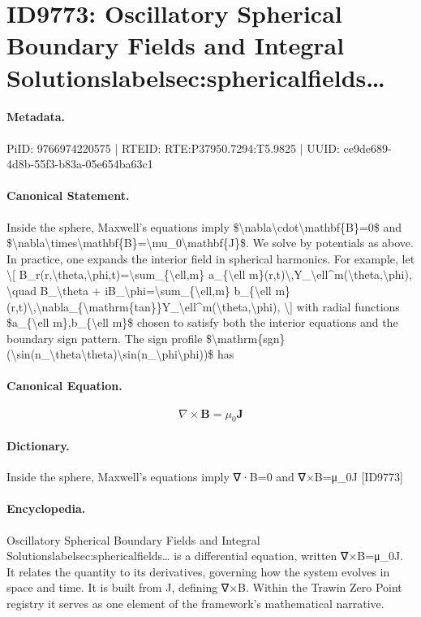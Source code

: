 \section*{ID9773: Oscillatory Spherical Boundary Fields and Integral Solutionslabelsec:sphericalfields…}
\paragraph{Metadata.}
PiID: 9766974220575 | RTEID: RTE:P37950.7294:T5.9825 | UUID: ce9de689-4d8b-55f3-b83a-05e654ba63c1

\paragraph{Canonical Statement.}
Inside the sphere, Maxwell's equations imply \$\textbackslash{}nabla\textbackslash{}cdot\textbackslash{}mathbf\{B\}=0\$ and \$\textbackslash{}nabla\textbackslash{}times\textbackslash{}mathbf\{B\}=\textbackslash{}mu\_0\textbackslash{}mathbf\{J\}\$. We solve by potentials as above. In practice, one expands the interior field in spherical harmonics. For example, let \textbackslash{}[ B\_r(r,\textbackslash{}theta,\textbackslash{}phi,t)=\textbackslash{}sum\_\{\textbackslash{}ell,m\} a\_\{\textbackslash{}ell m\}(r,t)\textbackslash{},Y\_\textbackslash{}ell\textasciicircum{}m(\textbackslash{}theta,\textbackslash{}phi), \textbackslash{}quad B\_\textbackslash{}theta + iB\_\textbackslash{}phi=\textbackslash{}sum\_\{\textbackslash{}ell,m\} b\_\{\textbackslash{}ell m\}(r,t)\textbackslash{},\textbackslash{}nabla\_\{\textbackslash{}mathrm\{tan\}\}Y\_\textbackslash{}ell\textasciicircum{}m(\textbackslash{}theta,\textbackslash{}phi), \textbackslash{}] with radial functions \$a\_\{\textbackslash{}ell m\},b\_\{\textbackslash{}ell m\}\$ chosen to satisfy both the interior equations and the boundary sign pattern. The sign profile \$\textbackslash{}mathrm\{sgn\}(\textbackslash{}sin(n\_\textbackslash{}theta\textbackslash{}theta)\textbackslash{}sin(n\_\textbackslash{}phi\textbackslash{}phi))\$ has

\paragraph{Canonical Equation.}
\[
\nabla\times\mathbf{B}=\mu_0\mathbf{J}
\]

\paragraph{Dictionary.}
Inside the sphere, Maxwell's equations imply ∇·B=0 and ∇×B=μ\_0J [ID9773]

\paragraph{Encyclopedia.}
Oscillatory Spherical Boundary Fields and Integral Solutionslabelsec:sphericalfields… is a differential equation, written ∇×B=μ\_0J. It relates the quantity to its derivatives, governing how the system evolves in space and time. It is built from J, defining ∇×B. Within the Trawin Zero Point registry it serves as one element of the framework's mathematical narrative.
